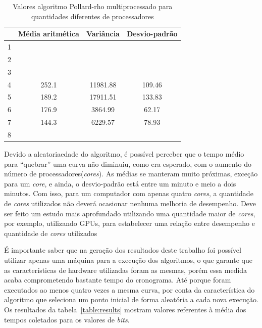 \begin{table}[h]
\centering
\begin{tabular}{|l|c|c|c|}
\hline
\rowcolor[gray]{0.9}
\multicolumn{1}{|c|}{\textbf{Cores}} & \textbf{Média aritmética}  & \textbf{Variância} & \textbf{Desvio-padrão} \\ \hline
1                                    &                            &                    &                        \\ \hline
2                                    &                            &                    &                        \\ \hline
3                                    &                            &                    &                        \\ \hline
4                                    & 252.1                      & 11981.88           & 109.46                 \\ \hline
5                                    & 189.2                      & 17911.51           & 133.83                 \\ \hline
6                                    & 176.9                      & 3864.99            &  62.17                 \\ \hline
7                                    & 144.3                      & 6229.57            &  78.93                 \\ \hline
8                                    &                            &                    &                        \\ \hline
\end{tabular}
\caption{Valores algoritmo Pollard-rho multiprocessado para quantidades diferentes de processadores}
\label{table:estatistica_mproc}
\end{table}

Devido a aleatoriaedade do algoritmo, é possível perceber que o tempo médio para ``quebrar'' uma curva não diminuiu, como era esperado, com o aumento do número de processadores(\textit{cores}). As médias se manteram muito próximas, exceção para um \textit{core}, e ainda, o desvio-padrão está entre um minuto e meio a dois minutos. Com isso, para um computador com apenas quatro \textit{cores}, a quantidade de \textit{cores} utilizados não deverá ocasionar nenhuma melhoria de desempenho. Deve ser feito um estudo mais aprofundado utilizando uma quantidade maior de \textit{cores}, por exemplo, utilizando GPUs, para estabelecer uma relação entre desempenho e quantidade de \textit{cores} utilizados

É importante saber que na geração dos resultados deste trabalho foi possível utilizar apenas uma máquina para a execução dos algoritmos, o que garante que as características de hardware utilizadas foram as mesmas, porém essa medida acaba comprometendo bastante tempo do cronograma. Até porque foram executados ao menos quatro vezes a mesma curva, por conta da característica do algoritmo que seleciona um ponto inicial de forma aleatória a cada nova execução. Os resultados da tabela~\ref{table:results} mostram valores referentes à média dos tempos coletados para os valores de \textit{bits}.
